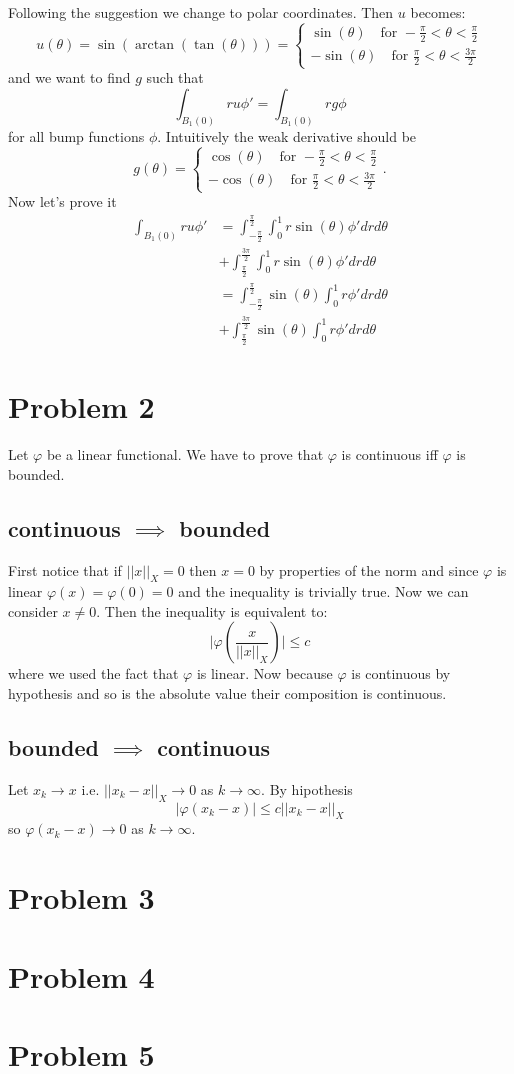\documentclass{article}
\begin{document}
Following the suggestion we change to polar coordinates.
Then $u$ becomes:
\[
u(\theta)=\sin(\arctan(\tan(\theta)))=\begin{cases}
	\sin(\theta) \quad \text{for } -\frac{\pi}{2} < \theta < \frac{\pi}{2}\\
	-\sin(\theta) \quad \text{for } \frac{\pi}{2} < \theta < \frac{3\pi}{2}
\end{cases}
\]
and we want to find $g$ such that
\[
	\int_{B_1(0)}ru\phi'=\int_{B_1(0)}rg\phi
\]
for all bump functions $\phi$.
Intuitively the weak derivative should be
\[
g(\theta)=\begin{cases}
	\cos(\theta) \quad \text{for } -\frac{\pi}{2} < \theta < \frac{\pi}{2}\\
	-\cos(\theta) \quad \text{for } \frac{\pi}{2} < \theta < \frac{3\pi}{2}
\end{cases}.
\]
Now let's prove it
\begin{align*}
	\int_{B_1(0)}ru\phi' &=\int_{-\frac{\pi}{2}}^{\frac{\pi}{2}} \int_0^1 r\sin(\theta)\phi'drd\theta\\
		      &+\int_{\frac{\pi}{2}}^{\frac{3\pi}{2}} \int_0^1 r\sin(\theta)\phi'drd\theta\\
		      &= \int_{-\frac{\pi}{2}}^{\frac{\pi}{2}}\sin(\theta) \int_0^1 r\phi'drd\theta\\
	  	      &+ \int_{\frac{\pi}{2}}^{\frac{3\pi}{2}}\sin(\theta) \int_0^1 r\phi'drd\theta
\end{align*}
\section*{Problem 2}
Let $\varphi$ be a linear functional. We have to prove that $\varphi$ is continuous
iff $\varphi$ is bounded.
\subsection*{continuous $\implies$ bounded}
First notice that if $||x||_X=0$ then $x=0$ by properties of the norm and since
$\varphi$ is linear $\varphi(x)=\varphi(0)=0$ and the inequality is trivially true. Now
we can consider $x\neq0$. Then the inequality is equivalent to:
\[
	\bigg|\varphi\left(\frac{x}{||x||_X}\right)\bigg| \leq c
\]
where we used the fact that $\varphi$ is linear. Now because $\varphi$ is
continuous by hypothesis and so is the absolute value their composition is
continuous.
\subsection*{bounded $\implies$ continuous}
Let $x_k \to x$ i.e. $||x_k-x||_X \to 0$ as $k \to \infty$. By hipothesis
\[
	|\varphi(x_k-x)|\leq c ||x_k-x||_X
\]
so $\varphi(x_k-x) \to 0$ as $k \to \infty$.

\section*{Problem 3}
\section*{Problem 4}
\section*{Problem 5}
\end{document}
